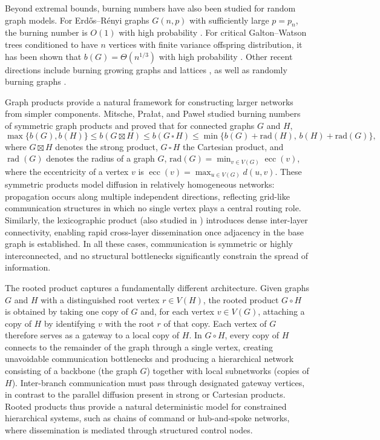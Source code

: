 \documentclass{article}
\begin{document}
Beyond extremal bounds, burning numbers have also been studied for random graph models. 
For Erd\H{o}s--R\'enyi graphs $G(n,p)$ with sufficiently large $p=p_n$, the burning number is $O(1)$ with high probability \cite{mitsche2017burning}. 
For critical Galton--Watson trees conditioned to have $n$ vertices with finite variance offspring distribution, it has been shown that $b(G) = \Theta(n^{1/3})$ with high probability \cite{devroye2025burning}. 
Other recent directions include burning growing graphs and lattices \cite{barrett2026achievable}, as well as randomly burning graphs \cite{blanc2025random}.

Graph products provide a natural framework for constructing larger networks from simpler components. 
Mitsche, Pra{\l}at, and Pawe{\l} \cite{mitsche2018burning} studied burning numbers of symmetric graph products and proved that for connected graphs $G$ and $H$,
\begin{equation}\label{eq: product inequalities}
\max\{b(G),b(H)\}
\le
b(G \boxtimes H)
\le
b(G \,\square\, H)
\le
\min\{ b(G)+\mathrm{rad}(H),\, b(H)+\mathrm{rad}(G) \},
\end{equation}
where $G \boxtimes H$ denotes the strong product, $G \,\square\, H$ the Cartesian product, and $\operatorname{rad}(G)$ denotes the radius of a graph $G$, $\mathrm{rad}(G) = \min_{v \in V(G)} \operatorname{ecc}(v)$, where the eccentricity of a vertex $v$ is
$\operatorname{ecc}(v) = \max_{u \in V(G)} d(u,v)$. These symmetric products model diffusion in relatively homogeneous networks: propagation occurs along multiple independent directions, reflecting grid-like communication structures in which no single vertex plays a central routing role.
Similarly, the lexicographic product (also studied in \cite{mitsche2018burning,bonato2021improved}) introduces dense inter-layer connectivity, enabling rapid cross-layer dissemination once adjacency in the base graph is established. 
In all these cases, communication is symmetric or highly interconnected, and no structural bottlenecks significantly constrain the spread of information.

The rooted product captures a fundamentally different architecture. 
Given graphs $G$ and $H$ with a distinguished root vertex $r \in V(H)$, the rooted product $G \circ H$ is obtained by taking one copy of $G$ and, for each vertex $v \in V(G)$, attaching a copy of $H$ by identifying $v$ with the root $r$ of that copy. 
Each vertex of $G$ therefore serves as a gateway to a local copy of $H$. 
In $G \circ H$, every copy of $H$ connects to the remainder of the graph through a single vertex, creating unavoidable communication bottlenecks and producing a hierarchical network consisting of a backbone (the graph $G$) together with local subnetworks (copies of $H$). 
Inter-branch communication must pass through designated gateway vertices, in contrast to the parallel diffusion present in strong or Cartesian products. 
Rooted products thus provide a natural deterministic model for constrained hierarchical systems, such as chains of command or hub-and-spoke networks, where dissemination is mediated through structured control nodes.
\end{document}
